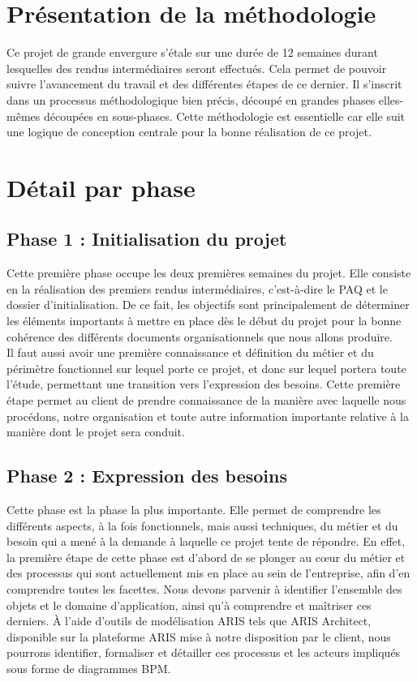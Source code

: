 
\section{Présentation de la méthodologie}

Ce projet de grande envergure s’étale sur une durée de 12 semaines durant lesquelles des rendus intermédiaires seront effectués. Cela permet de pouvoir suivre l’avancement du travail et des différentes étapes de ce dernier. Il s’inscrit dans un processus méthodologique bien précis, découpé en grandes phases elles-mêmes découpées en sous-phases. Cette méthodologie est essentielle car elle suit une logique de conception centrale pour la bonne réalisation de ce projet.

\section{Détail par phase}

\subsection{Phase 1 : Initialisation du projet}

Cette première phase occupe les deux premières semaines du projet. Elle consiste en la réalisation des premiers rendus intermédiaires, c’est-à-dire le PAQ et le dossier d’initialisation. De ce fait, les objectifs sont principalement de déterminer les éléments importants à mettre en place dès le début du projet pour la bonne cohérence des différents documents organisationnels que nous allons produire. \\

Il faut aussi avoir une première connaissance et définition du métier et du périmètre fonctionnel sur lequel porte ce projet, et donc sur lequel portera toute l’étude, permettant une transition vers l’expression des besoins. Cette première étape permet au client de prendre connaissance de la manière avec laquelle nous procédons, notre organisation et toute autre information importante relative à la manière dont le projet sera conduit.

\subsection{Phase 2 : Expression des besoins}

Cette phase est la phase la plus importante. Elle permet de comprendre les différents aspects, à la fois fonctionnels, mais aussi techniques, du métier et du besoin qui a mené à la demande à laquelle ce projet tente de répondre. En effet, la première étape de cette phase est d’abord de se plonger au c\oe{}ur du métier et des processus qui sont actuellement mis en place au sein de l’entreprise, afin d’en comprendre toutes les facettes. Nous devons parvenir à identifier l’ensemble des objets et le domaine d’application, ainsi qu’à comprendre et maîtriser ces derniers. À l’aide d’outils de modélisation ARIS tels que ARIS Architect, disponible sur la plateforme ARIS mise à notre disposition par le client, nous pourrons identifier, formaliser et détailler ces processus et les acteurs impliqués sous forme de diagrammes BPM. \\

